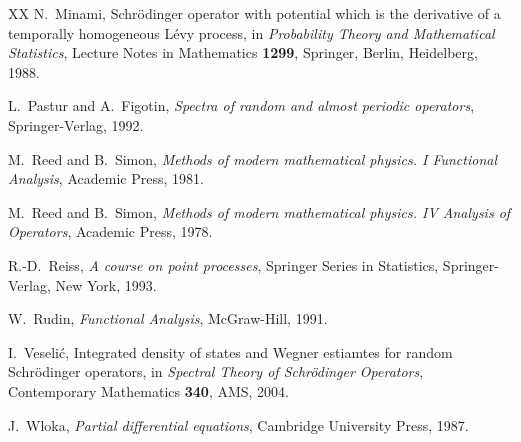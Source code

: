 \documentclass[12pt,a4paper]{article}
\begin{document}
\begin{thebibliography}{XX}
N.\ Minami,
Schr\"odinger operator with potential which is
the derivative of a temporally homogeneous L\'evy process,
in 
\textit{Probability Theory and Mathematical Statistics},
Lecture Notes in Mathematics \textbf{1299}, Springer, Berlin, Heidelberg, 1988.



L.\ Pastur and A.\ Figotin,
\textit{Spectra of random and almost 
periodic operators},
Springer-Verlag, 1992.

M.\ Reed and B.\ Simon,
\textit{Methods of modern mathematical physics. I Functional Analysis},
Academic Press, 1981.


M.\ Reed and B.\ Simon,
\textit{Methods of modern mathematical physics. IV Analysis of Operators},
Academic Press, 1978.

R.-D.\ Reiss,
\textit{A course on point processes},
Springer Series in Statistics, Springer-Verlag, New York, 1993.





W.\ Rudin,
\textit{Functional Analysis},
McGraw-Hill, 1991.

I.\ Veseli\'c,
Integrated density of states and Wegner estiamtes
for random Schr\"odinger operators,
in \textit{Spectral Theory of Schr\"odinger Operators},
Contemporary Mathematics \textbf{340}, AMS, 2004.


J.\ Wloka,
\textit{Partial differential equations},
Cambridge University Press,
1987.


\end{thebibliography}
\end{document}
